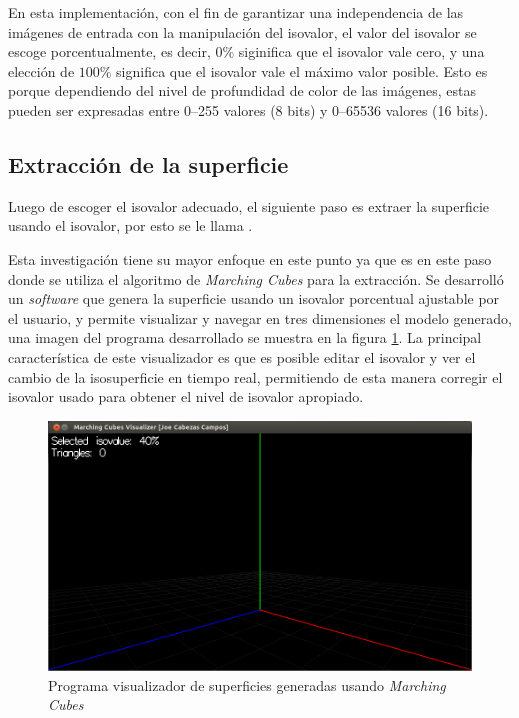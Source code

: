 En esta implementación, con el fin de garantizar una independencia de las imágenes de entrada con la manipulación del isovalor, el valor del isovalor se escoge porcentualmente, es decir, $0\%$ siginifica que el isovalor vale cero, y una elección de $100\%$ significa que el isovalor vale el máximo valor posible. Esto es porque dependiendo del nivel de profundidad de color de las imágenes, estas pueden ser expresadas entre 0--255 valores (8 bits) y 0--65536 valores (16 bits).

\subsection{Extracción de la superficie}
\label{ch:propuesta:sec:extraccionDeLaSuperficie}

Luego de escoger el isovalor adecuado, el siguiente paso es extraer la superficie usando el isovalor, por esto se le llama .

Esta investigación tiene su mayor enfoque en este punto ya que es en este paso donde se utiliza el algoritmo de \emph{Marching Cubes} para la extracción. Se desarrolló un \emph{software} que genera la superficie usando un isovalor porcentual ajustable por el usuario, y permite visualizar y navegar en tres dimensiones el modelo generado, una imagen del programa desarrollado se muestra en la figura \ref{f:flujoDeTrabajo:visualizer_1}. La principal característica de este visualizador es que es posible editar el isovalor y ver el cambio de la isosuperficie en tiempo real, permitiendo de esta manera corregir el isovalor usado para obtener el nivel de isovalor apropiado.

\begin{figure}[h]
\centering
	\includegraphics[width=1.0\textwidth]{images/visualizer/visualizer_1.png}
\caption{Programa visualizador de superficies generadas usando \emph{Marching Cubes}}
\label{f:flujoDeTrabajo:visualizer_1}
\end{figure}

